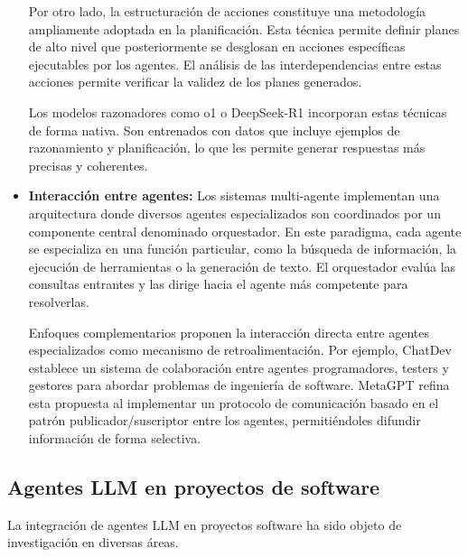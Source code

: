 \begin{itemize}
Por otro lado, la estructuración de acciones constituye una metodología ampliamente adoptada en la planificación\cite{lin_swiftsage_nodate}\cite{huang_language_nodate}\cite{wang_describe_2024}. Esta técnica permite definir planes de alto nivel que posteriormente se desglosan en acciones específicas ejecutables por los agentes\cite{zhu_ghost_2023}\cite{song_llm-planner_2023}\cite{wang_voyager_2023}\cite{liu_odyssey_2024}. El análisis de las interdependencias entre estas acciones permite verificar la validez de los planes generados\cite{raman_planning_nodate}\cite{liu_llmp_2023}\cite{dagan_dynamic_2023}.

Los modelos razonadores como o1 o DeepSeek-R1 incorporan estas técnicas de forma nativa\cite{noauthor_deepseek-r1deepseek_r1pdf_nodate}. Son entrenados con datos que incluye ejemplos de razonamiento y planificación, lo que les permite generar respuestas más precisas y coherentes.


\item{\textbf{Interacción entre agentes: }}Los sistemas multi-agente implementan una arquitectura donde diversos agentes especializados son coordinados por un componente central denominado orquestador\cite{karpas_mrkl_2022}\cite{ge_openagi_nodate}. En este paradigma, cada agente se especializa en una función particular, como la búsqueda de información, la ejecución de herramientas o la generación de texto. El orquestador evalúa las consultas entrantes y las dirige hacia el agente más competente para resolverlas.

Enfoques complementarios proponen la interacción directa entre agentes especializados como mecanismo de retroalimentación\cite{zhuge_mindstorms_2023}\cite{du_improving_nodate}. Por ejemplo, ChatDev\cite{qian_chatdev_2024} establece un sistema de colaboración entre agentes programadores, testers y gestores para abordar problemas de ingeniería de software. MetaGPT\cite{hong_metagpt_2024} refina esta propuesta al implementar un protocolo de comunicación basado en el patrón publicador/suscriptor entre los agentes, permitiéndoles difundir información de forma selectiva. 
\end{itemize}

\subsection{Agentes LLM en proyectos de software}

La integración de agentes LLM en proyectos software ha sido objeto de investigación en diversas áreas. 

